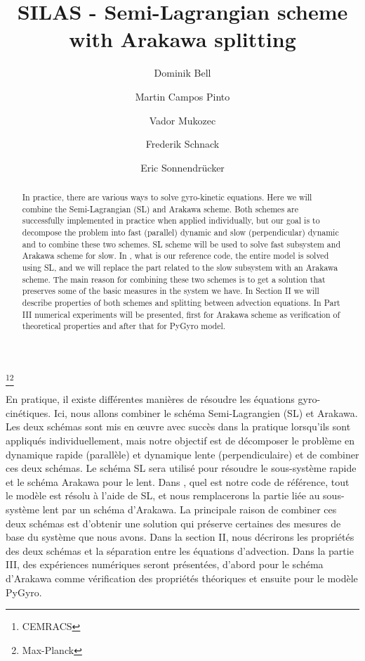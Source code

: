 \documentclass[proc]{edpsmath}
\begin{document}
\title{SILAS - Semi-Lagrangian scheme with Arakawa splitting}
\thanks{CEMRACS}\thanks{Max-Planck}%
%
\author{Dominik Bell}\address{Max-Planck-Institut für Plasmaphysik, Garching, Germany; }
\author{Martin Campos Pinto}
\author{Vador Mukozec}\address{Faculty of Sciences, University of Novi Sad, Serbia; }
\author{Frederik Schnack}
\author{Eric Sonnendrücker}

\begin{abstract}
In practice, there are various ways to solve gyro-kinetic equations. Here we will combine the Semi-Lagrangian (SL) and Arakawa scheme. Both schemes are successfully implemented in practice when applied individually, but our goal is to decompose the problem into fast (parallel) dynamic and slow (perpendicular) dynamic and to combine these two schemes. SL scheme will be used to solve fast subsystem and Arakawa scheme for slow. In \cite{pygyro_code}, what is our reference code, the entire model is solved using SL, and we will replace the part related to the slow subsystem with an Arakawa scheme. The main reason for combining these two schemes is to get a solution that preserves some of the basic measures in the system we have. In Section II we will describe properties of both schemes and splitting between advection equations. In Part III numerical experiments will be presented, first for Arakawa scheme as verification of theoretical properties and after that for PyGyro model.
\end{abstract}
%
\begin{resume}
En pratique, il existe différentes manières de résoudre les équations gyro-cinétiques. Ici, nous allons combiner le schéma Semi-Lagrangien (SL) et Arakawa. Les deux schémas sont mis en œuvre avec succès dans la pratique lorsqu'ils sont appliqués individuellement, mais notre objectif est de décomposer le problème en dynamique rapide (parallèle) et dynamique lente (perpendiculaire) et de combiner ces deux schémas. Le schéma SL sera utilisé pour résoudre le sous-système rapide et le schéma Arakawa pour le lent. Dans \cite{pygyro_code}, quel est notre code de référence, tout le modèle est résolu à l'aide de SL, et nous remplacerons la partie liée au sous-système lent par un schéma d'Arakawa. La principale raison de combiner ces deux schémas est d'obtenir une solution qui préserve certaines des mesures de base du système que nous avons. Dans la section II, nous décrirons les propriétés des deux schémas et la séparation entre les équations d'advection. Dans la partie III, des expériences numériques seront présentées, d'abord pour le schéma d'Arakawa comme vérification des propriétés théoriques et ensuite pour le modèle PyGyro.
\end{resume}
\end{document}
